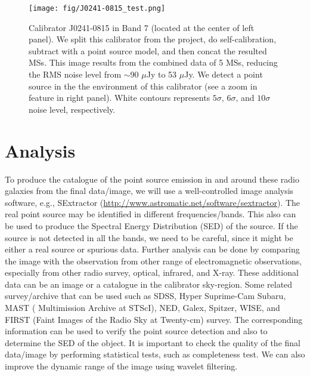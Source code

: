 \begin{figure}[ht]
\centering
\texttt{[image: fig/J0241-0815\_test.png]}
\caption[First result of the workflow for the calibrator J0241-0815 in ALMA Band 7.]{Calibrator J0241-0815 in Band 7 (located at the center of left panel). We split this calibrator from the project, do self-calibration, subtract with a point source model, and then concat the resulted MSs. This image results from the combined data of 5 MSs, reducing the RMS noise level from $\sim$90 $\mu$Jy to 53 $\mu$Jy. We detect a point source in the the environment of this calibrator (see a zoom in feature in right panel). White contours represents $5\sigma$, $6\sigma$, and $10\sigma$ noise level, respectively.}
\label{fig:test_J0241-0815_B7}
\end{figure}

\section{Analysis}

To produce the catalogue of the point source emission in and around these radio galaxies from the final data/image, we will use a well-controlled image analysis software, e.g., SExtractor (\url{http://www.astromatic.net/software/sextractor}). The real point source may be identified in different frequencies/bands. This also can be used to produce the Spectral Energy Distribution (SED) of the source. If the source is not detected in all the bands, we need to be careful, since it might be either a real source or spurious data. Further analysis can be done by comparing the image with the observation from other range of electromagnetic observations, especially from other radio survey, optical, infrared, and X-ray. These additional data can be an image or a catalogue in the calibrator sky-region. Some related survey/archive that can be used such as SDSS, Hyper Suprime-Cam Subaru, MAST ( Multimission Archive at STScI), NED, Galex, Spitzer, WISE, and FIRST (Faint Images of the Radio Sky at Twenty-cm) survey. The corresponding information can be used to verify the point source detection and also to determine the SED of the object. It is important to check the quality of the final data/image by performing statistical tests, such as completeness test. We can also improve the dynamic range of the image using wavelet filtering.

